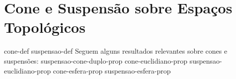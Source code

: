 \section{Cone e Suspensão sobre Espaços Topológicos}
\label{cone-suspensao}
{cone-def}
{suspensao-def}
Seguem alguns resultados relevantes sobre cones e suspensões:
{suspensao-cone-duplo-prop}
{cone-euclidiano-prop}
{suspensao-euclidiano-prop}
{cone-esfera-prop}
{suspensao-esfera-prop}